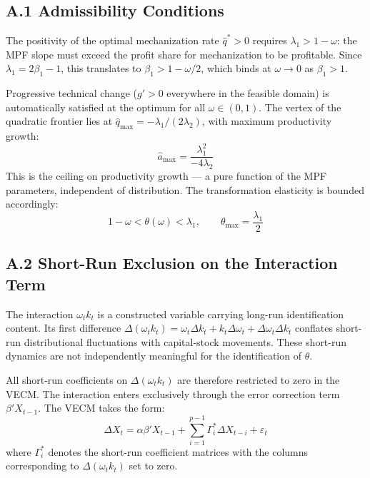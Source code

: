 
\subsection*{A.1 Admissibility Conditions}

The positivity of the optimal mechanization rate $\hat{q}^* > 0$
requires $\lambda_1 > 1 - \omega$: the MPF slope must exceed the
profit share for mechanization to be profitable. Since
$\lambda_1 = 2\beta_1 - 1$, this translates to $\beta_1 > 1 -
\omega/2$, which binds at $\omega \to 0$ as $\beta_1 > 1$.

Progressive technical change ($g' > 0$ everywhere in the feasible
domain) is automatically satisfied at the optimum for all
$\omega \in (0,1)$. The vertex of the quadratic frontier lies at
$\hat{q}_{\text{max}} = -\lambda_1 / (2\lambda_2)$, with maximum
productivity growth:
%
\begin{equation}
\hat{a}_{\text{max}} = \frac{\lambda_1^2}{-4\lambda_2}
\label{eq:amax}
\end{equation}
%
This is the ceiling on productivity growth --- a pure function of
the MPF parameters, independent of distribution. The transformation
elasticity is bounded accordingly:
%
\begin{equation}
1 - \omega < \theta(\omega) < \lambda_1,
\qquad
\theta_{\text{max}} = \frac{\lambda_1}{2}
\label{eq:theta_bounds}
\end{equation}


\subsection*{A.2 Short-Run Exclusion on the Interaction Term}

The interaction $\omega_t k_t$ is a constructed variable carrying
long-run identification content. Its first difference
$\Delta(\omega_t k_t) = \omega_t \Delta k_t + k_t \Delta \omega_t
+ \Delta \omega_t \Delta k_t$ conflates short-run distributional
fluctuations with capital-stock movements. These short-run dynamics
are not independently meaningful for the identification of $\theta$.

All short-run coefficients on $\Delta(\omega_t k_t)$ are therefore
restricted to zero in the VECM. The interaction enters exclusively
through the error correction term $\beta' X_{t-1}$. The VECM takes
the form:
%
\begin{equation}
\Delta X_t = \alpha \beta' X_{t-1}
+ \sum_{i=1}^{p-1} \Gamma_i^{*} \Delta X_{t-i}
+ \varepsilon_t
\label{eq:vecm_restricted}
\end{equation}
%
where $\Gamma_i^{*}$ denotes the short-run coefficient matrices with
the columns corresponding to $\Delta(\omega_t k_t)$ set to zero.


